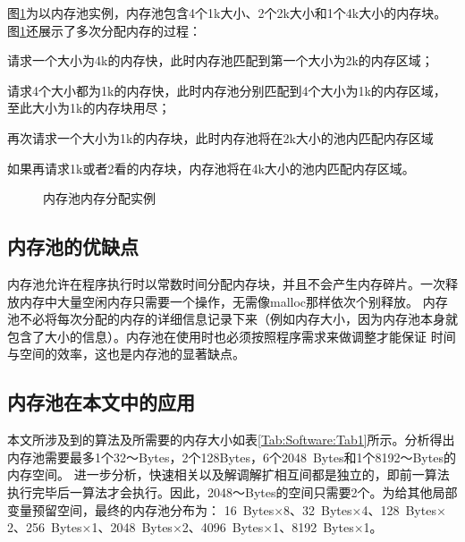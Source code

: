 	图\ref{Figure:Software:memalloc}为以内存池实例，内存池包含4个1k大小、2个2k大小和1个4k大小的内存块。图\ref{Figure:Software:memalloc}还展示了多次分配内存的过程：
	
\begin{publist}
	\item 请求一个大小为4k的内存快，此时内存池匹配到第一个大小为2k的内存区域；
	\item 请求4个大小都为1k的内存快，此时内存池分别匹配到4个大小为1k的内存区域，至此大小为1k的内存块用尽；
	\item 再次请求一个大小为1k的内存块，此时内存池将在2k大小的池内匹配内存区域
	\item 如果再请求1k或者2看的内存块，内存池将在4k大小的池内匹配内存区域。
\end{publist}

	\begin{figure}[htbp]
		\centering
		
		\caption{内存池内存分配实例}
		\label{Figure:Software:memalloc}
	\end{figure}

\subsection{内存池的优缺点}
	内存池允许在程序执行时以常数时间分配内存块，并且不会产生内存碎片。一次释放内存中大量空闲内存只需要一个操作，无需像malloc那样依次个别释放。
内存池不必将每次分配的内存的详细信息记录下来（例如内存大小，因为内存池本身就包含了大小的信息）。内存池在使用时也必须按照程序需求来做调整才能保证
时间与空间的效率，这也是内存池的显著缺点。

\subsection{内存池在本文中的应用}
	本文所涉及到的算法及所需要的内存大小如表\ref{Tab:Software:Tab1}所示。分析得出内存池需要最多1个32～Bytes，2个128Bytes，6个2048~Bytes和1个8192～Bytes的内存空间。
进一步分析，快速相关以及解调解扩相互间都是独立的，即前一算法执行完毕后一算法才会执行。因此，2048～Bytes的空间只需要2个。为给其他局部变量预留空间，最终的内存池分布为：
16~Bytes$\times$8、32~Bytes$\times$4、128~Bytes$\times$2、256~Bytes$\times$1、2048~Bytes$\times$2、4096~Bytes$\times$1、8192~Bytes$\times$1。


